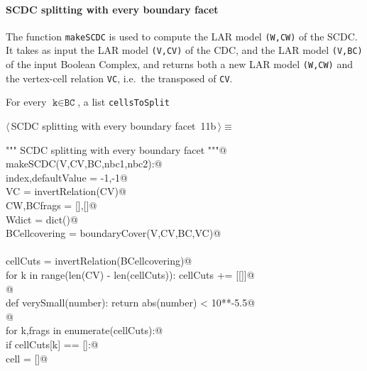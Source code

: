 \documentclass[11pt,oneside]{article}	%
\begin{document}
\paragraph{SCDC splitting with every boundary facet}
The function \texttt{makeSCDC} is used  to compute the LAR model \texttt{(W,CW)} of the SCDC.
It takes as input the LAR model \texttt{(V,CV)} of the CDC, and the LAR model \texttt{(V,BC)} of the input Boolean Complex, and returns both a new LAR model \texttt{(W,CW)} and the vertex-cell relation \texttt{VC}, i.e.~the transposed of \texttt{CV}.

For every $\texttt{k} \in \texttt{BC}$, a list \texttt{cellsToSplit}

\begin{flushleft} \small \label{scrap11}
\protect{}$\langle\,$SCDC splitting with every boundary facet\nobreak\ {\footnotesize 11b}$\,\rangle\equiv$
\vspace{-1ex}
\begin{list}{}{} \item
\mbox{}\verb@""" SCDC splitting with every boundary facet """@\\
\mbox{}\verb@def makeSCDC(V,CV,BC,nbc1,nbc2):@\\
\mbox{}\verb@   index,defaultValue = -1,-1@\\
\mbox{}\verb@   VC = invertRelation(CV)@\\
\mbox{}\verb@   CW,BCfrags = [],[]@\\
\mbox{}\verb@   Wdict = dict()@\\
\mbox{}\verb@   BCellcovering = boundaryCover(V,CV,BC,VC)@\\
\mbox{}\verb@@\\
\mbox{}\verb@   cellCuts = invertRelation(BCellcovering)@\\
\mbox{}\verb@   for k in range(len(CV) - len(cellCuts)): cellCuts += [[]]@\\
\mbox{}\verb@   @\\
\mbox{}\verb@   def verySmall(number): return abs(number) < 10**-5.5@\\
\mbox{}\verb@   @\\
\mbox{}\verb@   for k,frags in enumerate(cellCuts):@\\
\mbox{}\verb@      if cellCuts[k] == []:@\\
\mbox{}\verb@         cell = []@\\

\end{list}
\end{flushleft}
\end{document}

